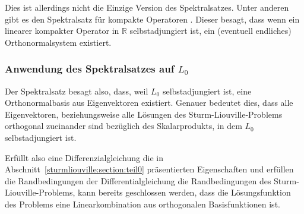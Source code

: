 Dies ist allerdings nicht die Einzige Version des Spektralsatzes.
Unter anderen gibt es den Spektralsatz für kompakte Operatoren 
\cite{sturmliouville:spektralsatz-wiki}.
Dieser besagt, dass wenn ein linearer kompakter Operator in
$\mathbb{R}$ selbstadjungiert ist, ein (eventuell endliches)
Orthonormalsystem existiert.

\subsubsection{Anwendung des Spektralsatzes auf $L_0$}

Der Spektralsatz besagt also, dass, weil $L_0$ selbstadjungiert ist, eine
Orthonormalbasis aus Eigenvektoren existiert.
Genauer bedeutet dies, dass alle Eigenvektoren, beziehungsweise alle Lösungen
des Sturm-Liouville-Problems orthogonal zueinander sind bezüglich des
Skalarprodukts, in dem $L_0$ selbstadjungiert ist.

Erfüllt also eine Differenzialgleichung die in
Abschnitt~\ref{sturmliouville:section:teil0} präsentierten Eigenschaften und 
erfüllen die Randbedingungen der Differentialgleichung die Randbedingungen
des Sturm-Liouville-Problems, kann bereits geschlossen werden, dass die
Lösungsfunktion des Problems eine Linearkombination aus orthogonalen
Basisfunktionen ist.